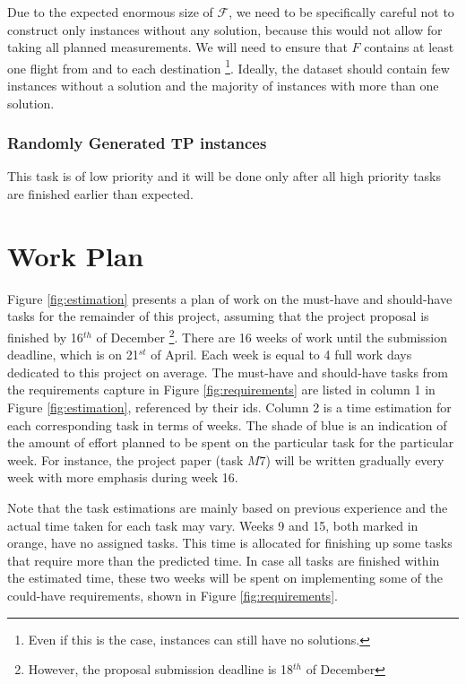 \documentclass{mprop}
\theoremstyle{definition}
\begin{document}
Due to the expected enormous size of $\mathcal{F}$, we need to be specifically careful not to construct only instances without any solution, because this would not allow for taking all planned measurements. We will need to ensure that $F$ contains at least one flight from and to each destination \footnote{Even if this is the case, instances can still have no solutions.}. Ideally, the dataset should contain few instances without a solution and the majority of instances with more than one solution.

\subsubsection*{Randomly Generated TP instances}
This task is of low priority and it will be done only after all high priority tasks are finished earlier than expected.

\section{Work Plan}
\label{sec:workplan}

Figure \ref{fig:estimation} presents a plan of work on the must-have and should-have tasks for the remainder of this project, assuming that the project proposal is finished by 16$^{th}$ of December \footnote{However, the proposal submission deadline is 18$^{th}$ of December}. There are 16 weeks of work until the submission deadline, which is on 21$^{st}$ of April. Each week is equal to 4 full work days dedicated to this project on average. The must-have and should-have tasks from the requirements capture in Figure \ref{fig:requirements} are listed in column 1 in Figure \ref{fig:estimation}, referenced by their ids. Column 2 is a time estimation for each corresponding task in terms of weeks. The shade of blue is an indication of the amount of effort planned to be spent on the particular task for the particular week. For instance, the project paper (task $M7$) will be written gradually every week with more emphasis during week 16.

Note that the task estimations are mainly based on previous experience and the actual time taken for each task may vary. Weeks 9 and 15, both marked in orange, have no assigned tasks. This time is allocated for finishing up some tasks that require more than the predicted time. In case all tasks are finished within the estimated time, these two weeks will be spent on implementing some of the could-have requirements, shown in Figure \ref{fig:requirements}.
\end{document}
